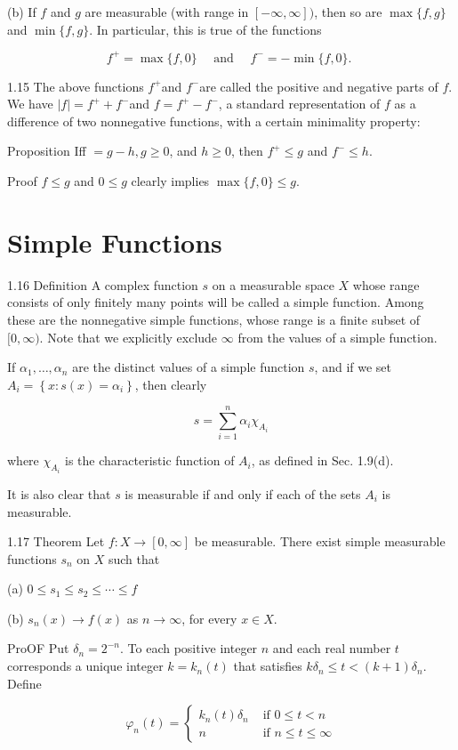 \documentclass[10pt]{article}
\begin{document}
(b) If $f$ and $g$ are measurable (with range in $[-\infty, \infty])$, then so are $\max \{f, g\}$ and $\min \{f, g\}$. In particular, this is true of the functions

$$
f^{+}=\max \{f, 0\} \quad \text { and } \quad f^{-}=-\min \{f, 0\} \text {. }
$$

1.15 The above functions $f^{+}$and $f^{-}$are called the positive and negative parts of $f$. We have $|f|=f^{+}+f^{-}$and $f=f^{+}-f^{-}$, a standard representation of $f$ as a difference of two nonnegative functions, with a certain minimality property:

Proposition Iff $=g-h, g \geq 0$, and $h \geq 0$, then $f^{+} \leq g$ and $f^{-} \leq h$.

Proof $f \leq g$ and $0 \leq g$ clearly implies $\max \{f, 0\} \leq g$.

\section{Simple Functions}
1.16 Definition A complex function $s$ on a measurable space $X$ whose range consists of only finitely many points will be called a simple function. Among these are the nonnegative simple functions, whose range is a finite subset of $[0, \infty)$. Note that we explicitly exclude $\infty$ from the values of a simple function.

If $\alpha_{1}, \ldots, \alpha_{n}$ are the distinct values of a simple function $s$, and if we set $A_{i}=\left\{x: s(x)=\alpha_{i}\right\}$, then clearly

$$
s=\sum_{i=1}^{n} \alpha_{i} \chi_{A_{i}}
$$

where $\chi_{A_{i}}$ is the characteristic function of $A_{i}$, as defined in Sec. 1.9(d).

It is also clear that $s$ is measurable if and only if each of the sets $A_{i}$ is measurable.

1.17 Theorem Let $f: X \rightarrow[0, \infty]$ be measurable. There exist simple measurable functions $s_{n}$ on $X$ such that

(a) $0 \leq s_{1} \leq s_{2} \leq \cdots \leq f$

(b) $s_{n}(x) \rightarrow f(x)$ as $n \rightarrow \infty$, for every $x \in X$.

ProOF Put $\delta_{n}=2^{-n}$. To each positive integer $n$ and each real number $t$ corresponds a unique integer $k=k_{n}(t)$ that satisfies $k \delta_{n} \leq t<(k+1) \delta_{n}$. Define

$$
\varphi_{n}(t)= \begin{cases}k_{n}(t) \delta_{n} & \text { if } 0 \leq t<n \\ n & \text { if } n \leq t \leq \infty\end{cases}
$$
\end{document}
